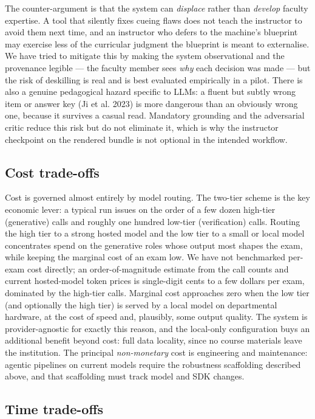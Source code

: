 \documentclass[
  11pt,
  letterpaper,
]{article}
\begin{document}
The counter-argument is that the system can \emph{displace} rather than
\emph{develop} faculty expertise. A tool that silently fixes cueing
flaws does not teach the instructor to avoid them next time, and an
instructor who defers to the machine's blueprint may exercise less of
the curricular judgment the blueprint is meant to externalise. We have
tried to mitigate this by making the system observational and the
provenance legible --- the faculty member sees \emph{why} each decision
was made --- but the risk of deskilling is real and is best evaluated
empirically in a pilot. There is also a genuine pedagogical hazard
specific to LLMs: a fluent but subtly wrong item or answer key (Ji et
al. 2023) is more dangerous than an obviously wrong one, because it
survives a casual read. Mandatory grounding and the adversarial critic
reduce this risk but do not eliminate it, which is why the instructor
checkpoint on the rendered bundle is not optional in the intended
workflow.

\subsection{Cost trade-offs}\label{sec-cost}

Cost is governed almost entirely by model routing. The two-tier scheme
is the key economic lever: a typical run issues on the order of a few
dozen high-tier (generative) calls and roughly one hundred low-tier
(verification) calls. Routing the high tier to a strong hosted model and
the low tier to a small or local model concentrates spend on the
generative roles whose output most shapes the exam, while keeping the
marginal cost of an exam low. We have not benchmarked per-exam cost
directly; an order-of-magnitude estimate from the call counts and
current hosted-model token prices is single-digit cents to a few dollars
per exam, dominated by the high-tier calls. Marginal cost approaches
zero when the low tier (and optionally the high tier) is served by a
local model on departmental hardware, at the cost of speed and,
plausibly, some output quality. The system is provider-agnostic for
exactly this reason, and the local-only configuration buys an additional
benefit beyond cost: full data locality, since no course materials leave
the institution. The principal \emph{non-monetary} cost is engineering
and maintenance: agentic pipelines on current models require the
robustness scaffolding described above, and that scaffolding must track
model and SDK changes.

\subsection{Time trade-offs}\label{time-trade-offs}
\end{document}
